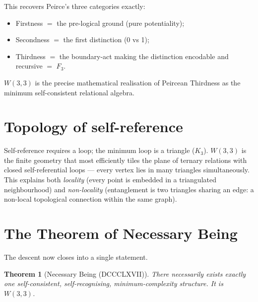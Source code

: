 \documentclass[11pt]{article}
\def\mathbb#1{#1}%
\newtheorem*{theorem}{Theorem}
\begin{document}
\noindent This recovers Peirce's three categories exactly:
\begin{itemize}[leftmargin=2em]
\item Firstness $=$ the pre-logical ground (pure potentiality);
\item Secondness $=$ the first distinction (0 vs 1);
\item Thirdness $=$ the boundary-act making the distinction encodable and recursive $=$ $\mathbb{F}_3$.
\end{itemize}

$W(3,3)$ is the precise mathematical realisation of Peircean Thirdness as the minimum self-consistent relational algebra.

\section{Topology of self-reference}

Self-reference requires a loop; the minimum loop is a triangle ($K_3$). $W(3,3)$ is the finite geometry that most efficiently tiles the plane of ternary relations with closed self-referential loops --- every vertex lies in many triangles simultaneously. This explains both \emph{locality} (every point is embedded in a triangulated neighbourhood) and \emph{non-locality} (entanglement is two triangles sharing an edge: a non-local topological connection within the same graph).

\section{The Theorem of Necessary Being}

The descent now closes into a single statement.

\begin{theorem}[Necessary Being (DCCCLXVII)]
There necessarily exists exactly one self-consistent, self-recognising, minimum-complexity structure. It is $W(3,3)$.
\end{theorem}
\end{document}

